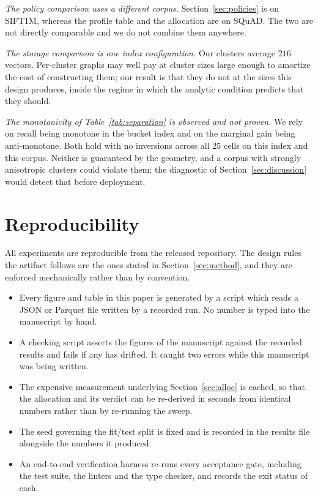 \documentclass[journal]{IEEEtran}
\begin{document}
\emph{The policy comparison uses a different corpus.}
Section~\ref{sec:policies} is on SIFT1M, whereas the profile table and the
allocation are on SQuAD. The two are not directly comparable and we do not
combine them anywhere.

\emph{The storage comparison is one index configuration.} Our clusters
average $216$ vectors. Per-cluster graphs may well pay at cluster sizes
large enough to amortize the cost of constructing them; our result is that
they do not at the sizes this design produces, inside the regime in which
the analytic condition predicts that they should.

\emph{The monotonicity of Table~\ref{tab:separation} is observed and not
proven.} We rely on recall being monotone in the bucket index and on the
marginal gain being anti-monotone. Both hold with no inversions across all
$25$ cells on this index and this corpus. Neither is guaranteed by the
geometry, and a corpus with strongly anisotropic clusters could violate
them; the diagnostic of Section~\ref{sec:discussion} would detect that
before deployment.

\section{Reproducibility}
\label{sec:repro}

All experiments are reproducible from the released repository. The design
rules the artifact follows are the ones stated in Section~\ref{sec:method},
and they are enforced mechanically rather than by convention.

\begin{itemize}
\item Every figure and table in this paper is generated by a script which
reads a JSON or Parquet file written by a recorded run. No number is typed
into the manuscript by hand.
\item A checking script asserts the figures of the manuscript against the
recorded results and fails if any has drifted. It caught two errors while
this manuscript was being written.
\item The expensive measurement underlying Section~\ref{sec:alloc} is
cached, so that the allocation and its verdict can be re-derived in seconds
from identical numbers rather than by re-running the sweep.
\item The seed governing the fit/test split is fixed and is recorded in the
results file alongside the numbers it produced.
\item An end-to-end verification harness re-runs every acceptance gate,
including the test suite, the linters and the type checker, and records the
exit status of each.
\end{itemize}
\end{document}
